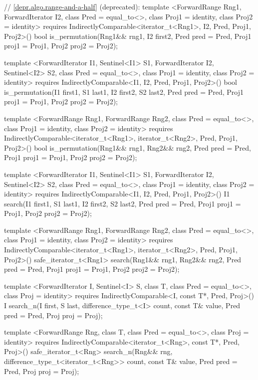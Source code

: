 \begin{codeblock}
{{{{  // \ref{depr.algo.range-and-a-half} (deprecated):
  template <ForwardRange Rng1, ForwardIterator I2, class Pred = equal_to<>,
      class Proj1 = identity, class Proj2 = identity>
    requires IndirectlyComparable<iterator_t<Rng1>, I2, Pred, Proj1, Proj2>()
    bool is_permutation(Rng1&& rng1, I2 first2, Pred pred = Pred{},
                        Proj1 proj1 = Proj1{}, Proj2 proj2 = Proj2{});

  template <ForwardIterator I1, Sentinel<I1> S1, ForwardIterator I2,
      Sentinel<I2> S2, class Pred = equal_to<>, class Proj1 = identity,
      class Proj2 = identity>
    requires IndirectlyComparable<I1, I2, Pred, Proj1, Proj2>()
    bool is_permutation(I1 first1, S1 last1, I2 first2, S2 last2,
                        Pred pred = Pred{},
                        Proj1 proj1 = Proj1{}, Proj2 proj2 = Proj2{});

  template <ForwardRange Rng1, ForwardRange Rng2, class Pred = equal_to<>,
      class Proj1 = identity, class Proj2 = identity>
    requires IndirectlyComparable<iterator_t<Rng1>, iterator_t<Rng2>, Pred, Proj1, Proj2>()
    bool is_permutation(Rng1&& rng1, Rng2&& rng2, Pred pred = Pred{},
                        Proj1 proj1 = Proj1{}, Proj2 proj2 = Proj2{});

  template <ForwardIterator I1, Sentinel<I1> S1, ForwardIterator I2,
      Sentinel<I2> S2, class Pred = equal_to<>,
      class Proj1 = identity, class Proj2 = identity>
    requires IndirectlyComparable<I1, I2, Pred, Proj1, Proj2>()
    I1
      search(I1 first1, S1 last1, I2 first2, S2 last2,
             Pred pred = Pred{},
             Proj1 proj1 = Proj1{}, Proj2 proj2 = Proj2{});

  template <ForwardRange Rng1, ForwardRange Rng2, class Pred = equal_to<>,
      class Proj1 = identity, class Proj2 = identity>
    requires IndirectlyComparable<iterator_t<Rng1>, iterator_t<Rng2>, Pred, Proj1, Proj2>()
    safe_iterator_t<Rng1>
      search(Rng1&& rng1, Rng2&& rng2, Pred pred = Pred{},
             Proj1 proj1 = Proj1{}, Proj2 proj2 = Proj2{});

  template <ForwardIterator I, Sentinel<I> S, class T,
      class Pred = equal_to<>, class Proj = identity>
    requires IndirectlyComparable<I, const T*, Pred, Proj>()
    I
      search_n(I first, S last, difference_type_t<I> count,
               const T& value, Pred pred = Pred{},
               Proj proj = Proj{});

  template <ForwardRange Rng, class T, class Pred = equal_to<>,
      class Proj = identity>
    requires IndirectlyComparable<iterator_t<Rng>, const T*, Pred, Proj>()
    safe_iterator_t<Rng>
      search_n(Rng&& rng, difference_type_t<iterator_t<Rng>> count,
               const T& value, Pred pred = Pred{}, Proj proj = Proj{});

}}}}
\end{codeblock}
